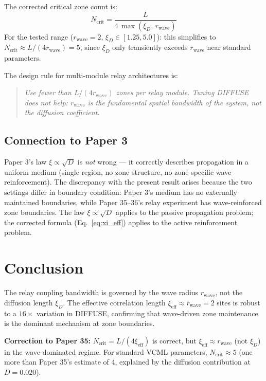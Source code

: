 \documentclass[11pt]{article}
\begin{document}
The corrected critical zone count is:
\begin{equation}
  \boxed{N_{\mathrm{crit}} = \frac{L}{4\, \max(\xi_D,\, r_{\mathrm{wave}})}}
  \label{eq:ncrit_corrected}
\end{equation}
For the tested range ($r_{\mathrm{wave}} = 2$, $\xi_D \in [1.25, 5.0]$):
this simplifies to $N_{\mathrm{crit}} \approx L/(4 r_{\mathrm{wave}}) = 5$,
since $\xi_D$ only transiently exceeds $r_{\mathrm{wave}}$ near standard parameters.

The design rule for multi-module relay architectures is:
\begin{quote}
  \emph{Use fewer than $L/(4 r_{\mathrm{wave}})$ zones per relay module.
  Tuning DIFFUSE does not help: $r_{\mathrm{wave}}$ is the fundamental spatial
  bandwidth of the system, not the diffusion coefficient.}
\end{quote}

\subsection*{Connection to Paper 3}

Paper 3's law $\xi \propto \sqrt{D}$ is \emph{not} wrong --- it correctly
describes propagation in a uniform medium (single region, no zone structure,
no zone-specific wave reinforcement). The discrepancy with the present result
arises because the two settings differ in boundary condition: Paper 3's
medium has no externally maintained boundaries, while Paper 35--36's relay
experiment has wave-reinforced zone boundaries. The law $\xi \propto \sqrt{D}$
applies to the passive propagation problem; the corrected formula
(Eq.~\ref{eq:xi_eff}) applies to the active reinforcement problem.

\section{Conclusion}

The relay coupling bandwidth is governed by the wave radius $r_{\mathrm{wave}}$,
not the diffusion length $\xi_D$. The effective correlation length
$\xi_{\mathrm{eff}} \approx r_{\mathrm{wave}} = 2$ sites is robust to a $16\times$
variation in DIFFUSE, confirming that wave-driven zone maintenance is
the dominant mechanism at zone boundaries.

\noindent\textbf{Correction to Paper 35:} $N_{\mathrm{crit}} = L/(4\xi_{\mathrm{eff}})$
is correct, but $\xi_{\mathrm{eff}} \approx r_{\mathrm{wave}}$ (not $\xi_D$) in the
wave-dominated regime. For standard VCML parameters, $N_{\mathrm{crit}} \approx 5$
(one more than Paper 35's estimate of 4, explained by the diffusion contribution
at $D = 0.020$).
\end{document}
